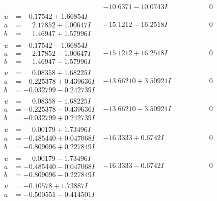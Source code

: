 \documentclass[1p]{elsarticle_modified}
\theoremstyle{definition}
\begin{document}
$$\begin{array}{c|c|c}
 & -10.6371 - 10.0743 I & \phantom{-0.000000 } 0 \\ \hline\begin{aligned}
u &= -0.17542 + 1.66854 I \\
a &= \phantom{-}2.17852 + 1.00647 I \\
b &= \phantom{-}1.46947 + 1.57996 I\end{aligned}
 & -15.1212 - 16.2518 I & \phantom{-0.000000 } 0 \\ \hline\begin{aligned}
u &= -0.17542 - 1.66854 I \\
a &= \phantom{-}2.17852 - 1.00647 I \\
b &= \phantom{-}1.46947 - 1.57996 I\end{aligned}
 & -15.1212 + 16.2518 I & \phantom{-0.000000 } 0 \\ \hline\begin{aligned}
u &= \phantom{-}0.08358 + 1.68225 I \\
a &= -0.225378 + 0.439636 I \\
b &= -0.032799 - 0.242739 I\end{aligned}
 & -13.66210 + 3.50921 I & \phantom{-0.000000 } 0 \\ \hline\begin{aligned}
u &= \phantom{-}0.08358 - 1.68225 I \\
a &= -0.225378 - 0.439636 I \\
b &= -0.032799 + 0.242739 I\end{aligned}
 & -13.66210 - 3.50921 I & \phantom{-0.000000 } 0 \\ \hline\begin{aligned}
u &= \phantom{-}0.00179 + 1.73496 I \\
a &= -0.485440 + 0.047068 I \\
b &= -0.809096 + 0.227849 I\end{aligned}
 & -16.3333 + 0.6742 I & \phantom{-0.000000 } 0 \\ \hline\begin{aligned}
u &= \phantom{-}0.00179 - 1.73496 I \\
a &= -0.485440 - 0.047068 I \\
b &= -0.809096 - 0.227849 I\end{aligned}
 & -16.3333 - 0.6742 I & \phantom{-0.000000 } 0 \\ \hline\begin{aligned}
u &= -0.10578 + 1.73887 I \\
a &= -0.500551 - 0.414501 I \\

\end{aligned}
\end{array}$$
\end{document}
